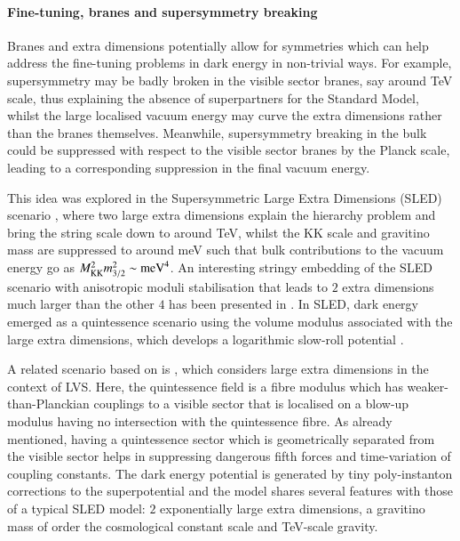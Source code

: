 \paragraph{Fine-tuning, branes and supersymmetry breaking}

Branes and extra dimensions potentially allow for symmetries which can help address the fine-tuning problems in dark energy in non-trivial ways. For example, supersymmetry may be badly broken in the visible sector branes, say around TeV scale, thus explaining the absence of superpartners for the Standard Model, whilst the large localised vacuum energy may curve the extra dimensions rather than the branes themselves.  Meanwhile, supersymmetry breaking in the bulk could be suppressed with respect to the visible sector branes by the Planck scale, leading to a corresponding suppression in the final vacuum energy. 

This idea was explored in the Supersymmetric Large Extra Dimensions (SLED) scenario \cite{Aghababaie:2003wz, Burgess:2004ib}, where two large extra dimensions explain the hierarchy problem \cite{Arkani-Hamed:1998jmv, Antoniadis:1998ig} and bring the string scale down to around TeV, whilst the KK scale and gravitino mass are suppressed to around meV such that bulk contributions to the vacuum energy go as $M_{\rm KK}^2 m_{3/2}^2 \sim {\rm meV}^4$. An interesting stringy embedding of the SLED scenario with anisotropic moduli stabilisation that leads to $2$ extra dimensions much larger than the other $4$ has been presented in \cite{Cicoli:2011yy}. In SLED, dark energy emerged as a quintessence scenario using the volume modulus associated with the large extra dimensions, which develops a logarithmic slow-roll potential \cite{Albrecht:2001cp, Albrecht:2001xt}.  

A related scenario based on \cite{Cicoli:2011yy} is \cite{Cicoli:2012tz}, which considers large extra dimensions in the context of LVS. Here, the quintessence field is a fibre modulus which has weaker-than-Planckian couplings to a visible sector that is localised on a blow-up modulus having no intersection with the quintessence fibre. As already mentioned, having a quintessence sector which is geometrically separated from the visible sector helps in suppressing dangerous fifth forces and time-variation of coupling constants. The dark energy potential is generated by tiny poly-instanton corrections to the superpotential and the model shares several features with those of a typical SLED model: $2$ exponentially large extra dimensions, a gravitino mass of order the cosmological constant scale and TeV-scale gravity.

